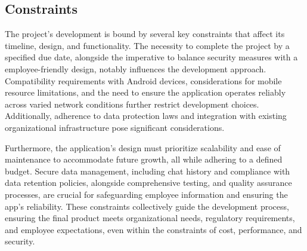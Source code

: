 \documentclass[]{article}
\begin{document}
\subsection{Constraints}
\label{sub:constraints}
\hspace{5mm}The project's development is bound by several key constraints that affect its timeline, design, and functionality. The necessity to complete the project by a specified due date, alongside the imperative to balance security measures with a employee-friendly design, notably influences the development approach. Compatibility requirements with Android devices, considerations for mobile resource limitations, and the need to ensure the application operates reliably across varied network conditions further restrict development choices. Additionally, adherence to data protection laws and integration with existing organizational infrastructure pose significant considerations.

\hspace{5mm}Furthermore, the application's design must prioritize scalability and ease of maintenance to accommodate future growth, all while adhering to a defined budget. Secure data management, including chat history and compliance with data retention policies, alongside comprehensive testing, and quality assurance processes, are crucial for safeguarding employee information and ensuring the app's reliability. These constraints collectively guide the development process, ensuring the final product meets organizational needs, regulatory requirements, and employee expectations, even within the constraints of cost, performance, and security.

\end{document}
